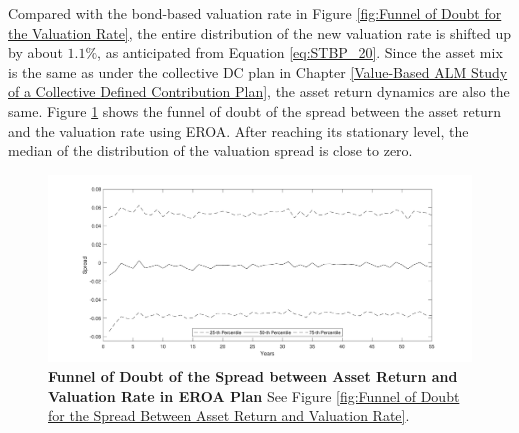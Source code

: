 \documentclass{sfuthesis}
\numberwithin{equation}{chapter}
\begin{document}
		\justify
		Compared with the bond-based valuation rate in Figure \ref{fig:Funnel of Doubt for the Valuation Rate}, the entire distribution of the new valuation rate is shifted up by about $1.1\%$, as anticipated from Equation \eqref{eq:STBP_20}. Since the asset mix is the same as under the collective DC plan in Chapter \ref{Value-Based ALM Study of a Collective Defined Contribution Plan}, the asset return dynamics are also the same. Figure \ref{fig:Funnel of Doubt of the Spread between Asset Return and Valuation Rate in EROA Plan} shows the funnel of doubt of the spread between the asset return and the valuation rate using EROA. After reaching its stationary level, the median of the distribution of the valuation spread is close to zero.
		\begin{figure}[H]
			\includegraphics[width=1\linewidth]{ResultPlot/Spread1.pdf} 
			\caption[Funnel of Doubt of the Spread between Asset Return and Valuation Rate in EROA Plan]{\textbf{Funnel of Doubt of the Spread between Asset Return and Valuation Rate in EROA Plan}
				\vspace{-0.4cm}
				\newline\footnotesize\justify See Figure \ref{fig:Funnel of Doubt for the Spread Between Asset Return and Valuation Rate}.}
			\label{fig:Funnel of Doubt of the Spread between Asset Return and Valuation Rate in EROA Plan}
		\end{figure}
	
	
		\justify
		
\end{document}
